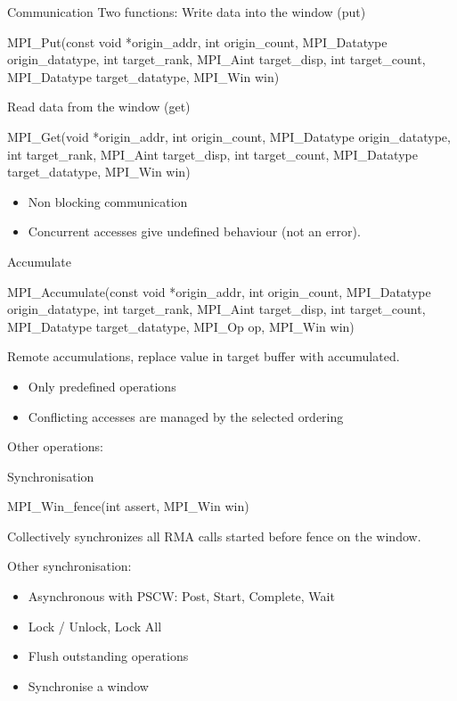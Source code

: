 \documentclass[aspectratio=43]{beamer}
\begin{document}
\begin{frame}[fragile]{Communication}
Two functions:
Write data into the window (put)
\begin{Cpplisting}[]{}
MPI_Put(const void *origin_addr, int origin_count, MPI_Datatype origin_datatype, int target_rank, MPI_Aint target_disp, int target_count, MPI_Datatype target_datatype, MPI_Win win)
\end{Cpplisting}

Read data from the window (get)
\begin{Cpplisting}[]{}
MPI_Get(void *origin_addr, int origin_count, MPI_Datatype origin_datatype, int target_rank, MPI_Aint target_disp, int target_count, MPI_Datatype target_datatype, MPI_Win win)
\end{Cpplisting}

\begin{itemize}
\item Non blocking communication
\item Concurrent accesses give undefined behaviour (not an error).
\end{itemize}

\end{frame}


\begin{frame}[fragile]{Accumulate}
\begin{Cpplisting}[]{}
MPI_Accumulate(const void *origin_addr, int origin_count, MPI_Datatype origin_datatype, int target_rank, MPI_Aint target_disp, int target_count, MPI_Datatype target_datatype, MPI_Op op, MPI_Win win)
\end{Cpplisting}

Remote accumulations, replace value in target buffer with accumulated.

\begin{itemize}
\item Only predefined operations
\item Conflicting accesses are managed by the selected ordering
\end{itemize}

Other operations: 
\end{frame}

\begin{frame}[fragile]{Synchronisation}
\begin{Cpplisting}[]{}
MPI_Win_fence(int assert, MPI_Win win)
\end{Cpplisting}
Collectively synchronizes all RMA calls started before fence on the window.

Other synchronisation:
\begin{itemize}
\item Asynchronous with PSCW: Post, Start, Complete, Wait
\item Lock / Unlock, Lock All
\item Flush outstanding operations
\item Synchronise a window
\end{itemize}
\end{frame}

\end{document}
